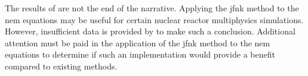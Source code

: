   The results of \citeauthor{caslJFNK} are not the end of the narrative. 
  Applying the \gls{jfnk} method to the \gls{nem} equations may be useful for
  certain nuclear reactor multiphysics simulations. However, insufficient data 
  is provided by \citeauthor{qe2paper} to make such a conclusion. Additional
  attention must be paid in the application of the \gls{jfnk} method to the
  \gls{nem} equations to determine if such an implementation would provide
  a benefit compared to existing methods.
